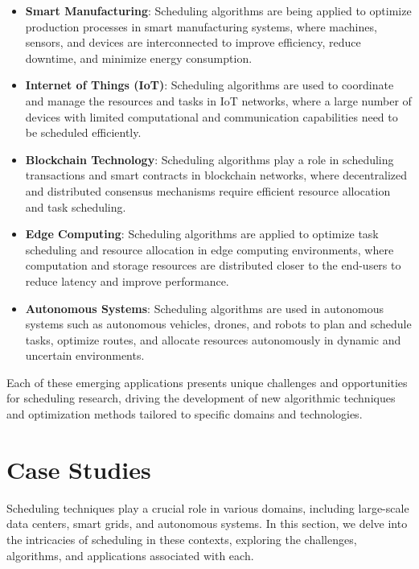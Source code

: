 \documentclass[12pt]{book} %
\begin{document}
\begin{itemize}
    \item \textbf{Smart Manufacturing}: Scheduling algorithms are being applied to optimize production processes in smart manufacturing systems, where machines, sensors, and devices are interconnected to improve efficiency, reduce downtime, and minimize energy consumption.
    
    \item \textbf{Internet of Things (IoT)}: Scheduling algorithms are used to coordinate and manage the resources and tasks in IoT networks, where a large number of devices with limited computational and communication capabilities need to be scheduled efficiently.
    
    \item \textbf{Blockchain Technology}: Scheduling algorithms play a role in scheduling transactions and smart contracts in blockchain networks, where decentralized and distributed consensus mechanisms require efficient resource allocation and task scheduling.
    
    \item \textbf{Edge Computing}: Scheduling algorithms are applied to optimize task scheduling and resource allocation in edge computing environments, where computation and storage resources are distributed closer to the end-users to reduce latency and improve performance.
    
    \item \textbf{Autonomous Systems}: Scheduling algorithms are used in autonomous systems such as autonomous vehicles, drones, and robots to plan and schedule tasks, optimize routes, and allocate resources autonomously in dynamic and uncertain environments.
\end{itemize}

Each of these emerging applications presents unique challenges and opportunities for scheduling research, driving the development of new algorithmic techniques and optimization methods tailored to specific domains and technologies.

\section{Case Studies}
Scheduling techniques play a crucial role in various domains, including large-scale data centers, smart grids, and autonomous systems. In this section, we delve into the intricacies of scheduling in these contexts, exploring the challenges, algorithms, and applications associated with each.
\end{document}

